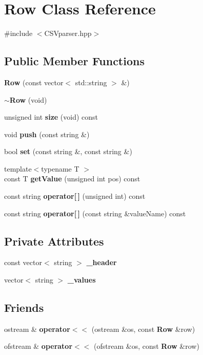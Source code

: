 \section{Row Class Reference}
\label{class_row}


{\ttfamily \#include $<$C\+S\+Vparser.\+hpp$>$}

\subsection*{Public Member Functions}
\begin{DoxyCompactItemize}
\item 
\textbf{ Row} (const vector$<$ std\+::string $>$ \&)
\item 
\textbf{ $\sim$\+Row} (void)
\item 
unsigned int \textbf{ size} (void) const
\item 
void \textbf{ push} (const string \&)
\item 
bool \textbf{ set} (const string \&, const string \&)
\item 
{\footnotesize template$<$typename T $>$ }\\const T \textbf{ get\+Value} (unsigned int pos) const
\item 
const string \textbf{ operator[$\,$]} (unsigned int) const
\item 
const string \textbf{ operator[$\,$]} (const string \&value\+Name) const
\end{DoxyCompactItemize}
\subsection*{Private Attributes}
\begin{DoxyCompactItemize}
\item 
const vector$<$ string $>$ \textbf{ \+\_\+header}
\item 
vector$<$ string $>$ \textbf{ \+\_\+values}
\end{DoxyCompactItemize}
\subsection*{Friends}
\begin{DoxyCompactItemize}
\item 
ostream \& \textbf{ operator$<$$<$} (ostream \&os, const \textbf{ Row} \&row)
\item 
ofstream \& \textbf{ operator$<$$<$} (ofstream \&os, const \textbf{ Row} \&row)
\end{DoxyCompactItemize}


